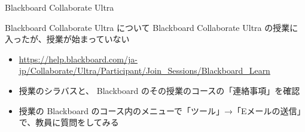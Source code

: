 \documentclass[a4j,10pt]{jsarticle}
\def\lthtmlcheckvsize{\ifdim\ht\sizebox<\vsize 
  \ifdim\wd\sizebox<\hsize\expandafter\hfill\fi \expandafter\vfill
  \else\expandafter\vss\fi}%
\begin{document}
{\newpage\clearpage
{}%
\begin{frame}[label={sec:org30568a4},fragile]{Blackboard Collaborate Ultra}
\begin{block}{Blackboard Collaborate Ultra について}
Blackboard Collaborate Ultra の授業に入ったが、授業が始まっていない
\par
\begin{itemize}
\item \url{https://help.blackboard.com/ja-jp/Collaborate/Ultra/Participant/Join\_Sessions/Blackboard\_Learn}
\item 授業のシラバスと、 Blackboard のその授業のコースの「連絡事項」を確認
\item 授業の Blackboard のコース内のメニューで「ツール」→「Eメールの送信」で、教員に質問をしてみる
\end{itemize}
\end{block}
\end{frame}%
\lthtmlfigureZ
\lthtmlcheckvsize\clearpage}
\end{document}
